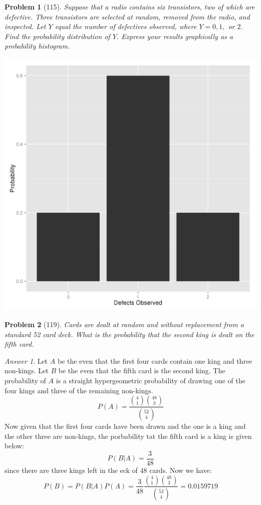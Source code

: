 \documentclass{article}
\theoremstyle{problem}
\newtheorem{prob}{Problem}
\theoremstyle{remark}
\newtheorem*{answer}{Answer}
\begin{document}
\begin{prob}[115]
Suppose that a radio contains six transistors, two of which are defective. Three transistors are selected at random, removed from the radio, and inspected. Let $Y$ equal the number of defectives observed, where $Y = 0, 1,$ or $2$. Find the probability distribution of $Y$. Express your results graphically as a probability histogram.
\end{prob}
\begin{multicols}{2}

\vfill
\columnbreak
\begin{center}
\includegraphics[scale=.35]{problem115.png}
\end{center}
\end{multicols}
% 


\begin{prob}[119]
Cards are dealt at random and without replacement from a standard 52 card deck. What is the probability that the second king is dealt on the fifth card.
\end{prob}
\begin{answer}
Let $A$ be the even that the first four cards contain one king and three non-kings. Let $B$ be the even that the fifth card is the second king. The probability of $A$ is a straight hypergeometric probability of drawing one of the four kings and three of the remaining non-kings.
$$
P(A) = \frac{\displaystyle {4 \choose 1} {48 \choose 3}}{\displaystyle {52 \choose 4}}
$$ 
Now given that the first four cards have been drawn and the one is a king and the other three are non-kings, the porbability tat the fifth card is a king is given below:
$$
P(B|A) = \frac{3}{48}
$$
since there  are three kings left in the eck of 48 cards. Now we have:
$$
P(B) = P(B|A)P(A) = \frac{3}{48} \frac{\displaystyle {4 \choose 1} {48 \choose 3}}{\displaystyle {52 \choose 4}} = 0.0159719
$$
\end{answer}
% 
\end{document}
